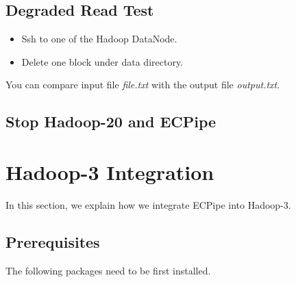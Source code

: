 \documentclass[letterpaper,12pt]{article}
\newcommand{\sysname}{{\sf\small ECPipe}\xspace}
\begin{document}
\subsection{Degraded Read Test}

\begin{itemize}
\item Ssh to one of the Hadoop DataNode.
\item Delete one block under data directory.
\end{itemize}

\begin{center}
\noindent{}
\end{center}

You can compare input file {\sl file.txt} with the output file {\sl output.txt}.

\subsection{Stop Hadoop-20 and ECPipe}

\begin{center}
\noindent{}
\end{center}

\section{Hadoop-3 Integration}

In this section, we explain how we integrate \sysname into Hadoop-3.

\subsection{Prerequisites}

The following packages need to be first installed.
\end{document}
